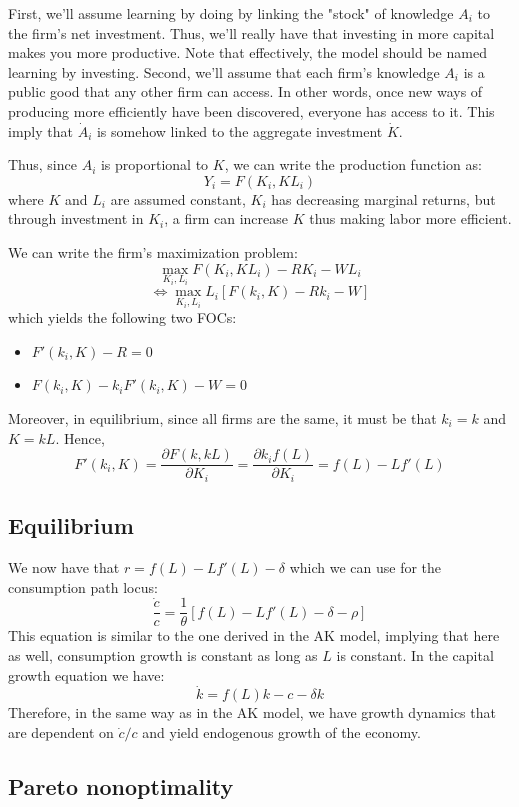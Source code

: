 \documentclass[12pt]{report}
\begin{document}
First, we'll assume learning by doing by linking the "stock" of knowledge $A_i$ to the firm's net investment. Thus, we'll really have that investing in more capital makes you more productive. Note that effectively, the model should be named learning by investing. Second, we'll assume that each firm's knowledge $A_i$ is a public good that any other firm can access. In other words, once new ways of producing more efficiently have been discovered, everyone has access to it. This imply that $\dot A_i$ is somehow linked to the aggregate investment $\dot K$.

Thus, since $A_i$ is proportional to $K$, we can write the production function as: $$Y_i = F(K_i, KL_i)$$ where $K$ and $L_i$ are assumed constant, $K_i$ has decreasing marginal returns, but through investment in $K_i$, a firm can increase $K$ thus making labor more efficient. 

We can write the firm's maximization problem:$$\max_{K_i, L_i} F(K_i, KL_i) - RK_i - WL_i $$ $$\Leftrightarrow\max_{K_i, L_i} L_i[F(k_i, K) - Rk_i - W] $$ which yields the following two FOCs:\begin{itemize}
\item $F'(k_i,K) - R = 0$
\item $F(k_i,K) - k_iF'(k_i,K) - W = 0$
\end{itemize} Moreover, in equilibrium, since all firms are the same, it must be that $k_i = k$ and $K = kL$. Hence, $$F'(k_i, K) = \frac{\partial F(k, kL)}{\partial K_i} =  \frac{\partial k_i f(L)}{\partial K_i} = f(L) - Lf'(L)$$

\subsection{Equilibrium}

We now have that $r = f(L) - Lf'(L) - \delta$ which we can use for the consumption path locus: $$\frac{\dot c}{c} = \frac{1}{\theta} [ f(L) - Lf'(L) - \delta - \rho ] $$ This equation is similar to the one derived in the AK model, implying that here as well, consumption growth is constant as long as $L$ is constant. In the capital growth equation we have: $$\dot k = f(L)k - c - \delta k $$ Therefore, in the same way as in the AK model, we have growth dynamics that are dependent on $\dot c/c$ and yield endogenous growth of the economy.

\subsection{Pareto nonoptimality}
\end{document}
